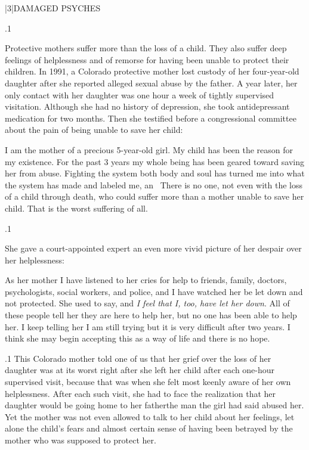 \documentclass[11pt, twoside]{article}
\begin{document}
{\s|3|{DAMAGED PSYCHES}

\p.1{%
\noindent{}Protective mothers suffer more than the loss of a child. They also suffer deep feelings of helplessness and of remorse for having been unable
to protect their children. In 1991, a Colorado protective mother lost
custody of her four-year-old daughter after she reported alleged sexual
abuse by the father. A year later, her only contact with her daughter was one hour a week of tightly supervised visitation. Although she
had no history of depression, she took antidepressant medication for
two months. Then she testified before a congressional committee about
the pain of being unable to save her child:

\begin{blockQuote}
I am the mother of a precious 5-year-old girl. My child has been
the reason for my existence. For the past 3 years my whole being
has been geared toward saving her from abuse. Fighting the system
both body and soul has turned me into what the system has made
and labeled me, an  \ellThree{2pt}{2pt}\ There is no one, not
even with the loss of a child through death, who could suffer more
than a mother unable to save her child. That is the worst suffering
of all.
\end{blockQuote}

}%

\p.1{%
She gave a court-appointed expert an even more vivid picture of her
despair over her helplessness:

\begin{blockQuote}
As her mother I have listened to her cries for help to friends, family, doctors, psychologists, social workers, and police, and I have
watched her be let down and not protected. She used to say,  and \textit{I feel that I, too, have let her down}. All
of these people tell her they are here to help her, but no one has
been able to help her. I keep telling her I am still trying but it is
very difficult after two years. I think she may begin accepting this
as a way of life and there is no hope.
\end{blockQuote}

}%

\p.1{%
This Colorado mother told one of us that her grief over the loss of
her daughter was at its worst right after she left her child after
each one-hour supervised visit, because that was when she felt most keenly aware
of her own helplessness. After each such visit, she had to face the realization that her daughter would be going home to her father\mdash{}the man
the girl had said abused her. Yet the mother was not even allowed to
talk to her child about her feelings, let alone the child’s fears and almost
certain sense of having been betrayed by the mother who was supposed
to protect her.
}%

}
\end{document}
